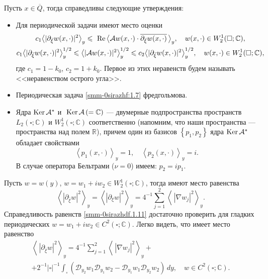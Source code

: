 \begin{theorem}\label{smm2-th3}  Пусть $x\in\overline Q$, тогда справедливы следующие утверждения:
\begin{itemize}
	\item  {Для периодической задачи имеют место оценки}
	\begin{gather}\label{smm-0sirazhf:1.9}
		c_1\big<|\partial_{\bar{\xi}}w(x,\cdot)|^2\big>_y\leqslant \text{ Re\,}\big<\mathcal{A}w(x,\cdot)\cdot \overline{\partial_{\bar{\xi}}w(x,\cdot)}\,\big>_y,\quad  w(x,\cdot)\in W_2^1(\square;\mathbb{C}),\\
		c_1\big<|\partial_{\bar{\xi}}w(x,\cdot)|^2\big>_y^{1/2}\leqslant
		\big<|\mathcal{A}w(x,\cdot)|^2\big>_y^{1/2}\leqslant c_2\big<|\partial_{\bar{\xi}}w(x,\cdot)|^2\big>_y^{1/2},\quad  w(x,\cdot)\in W_2^1(\square;\mathbb{C}),\label{smm-0sirazhf:1.9'}
	\end{gather}
	{ где $c_1=1-k_0$, $c_2=1+k_0$. Первое из этих неравенств будем называть <<неравенством острого угла>>}.
	\item { Периодическая задача \eqref{smm-0sirazhf:1.7} фредгольмова.}
	\item {Ядра  $\text{Ker\,}\mathcal{A}^\ast$ и $\text{ Ker\,}\mathcal{A}\,(=\mathbb{C})$
		--- двумерные подпространства пространств $L_2(\square;\mathbb{C})$ и $W_2^1(\square;\mathbb{C})$ соответственно {(}напомним, что
		наши пространства --- пространства над полем $\mathbb{R}${)},
		причем один из базисов $\left\{p_1,p_2\right\}$ ядра
		$\text{Ker\,}\mathcal{A}^\ast$ обладает свойствами
		\begin{equation}\label{smm-0sirazhdf:1.10}
			\left< p_1(x,\cdot)\right>_y=1,\quad \left< p_2(x,\cdot)\right>_y=i.
		\end{equation}
		В случае оператора Бельтрами {(}$\nu=0${)} имеем: $p_2=ip_1$.}
\end{itemize}
\end{theorem}
Пусть $w=w(y)$, $w=w_1+iw_2\in W_2^1(\square;\mathbb{C})$, тогда имеют место равенства
\begin{equation}\label{smm-0sirazhdf.1.11}
	\left<|\partial_{\bar{\xi}}w|^2\right>_y=\left<|\partial_{\xi}w|^2\right>_y=4^{-1}\sum_{j=1}^2\left<
	\,|\nabla w_j|^2\right>_y.
\end{equation}
Справедливость равенств \eqref{smm-0sirazhdf.1.11} достаточно проверить  для  гладких периодических $w=w_1+iw_2\in C^2(\square;\mathbb{C})$. Легко видеть, что имеет место равенство
\begin{equation}\label{smm-0sirazhdf.1.111}
	\begin{gathered}
		\left<\,|\partial_{\bar \xi} w|^2\right>_y=4^{-1}\sum_{j=1}^2\left<
		\,|\nabla w_j|^2\right>_y+\\
		+2^{-1}|\square|^{-1}\int_{\square}\left(\mathscr{D}_{y_2}w_1\mathscr{D}_{y_1}w_2-\mathscr{D}_{y_1}w_1\mathscr{D}_{y_2}w_2\right)\,dy,\quad w\in C^2(\square;\mathbb{C}).
	\end{gathered}
\end{equation}
